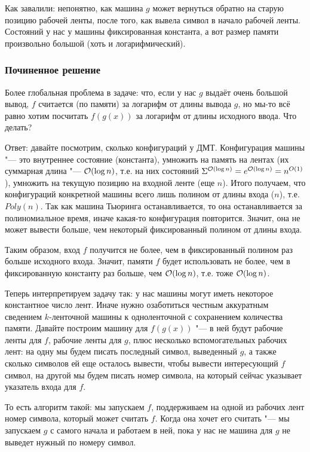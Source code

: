	Как завалили: непонятно, как машина $g$ может вернуться обратно на старую позицию рабочей ленты,
	после того, как вывела символ в начало рабочей ленты.
	Состояний у нас у машины фиксированная константа, а вот размер памяти произвольно большой (хоть и логарифмический).

	\subsubsection{Починенное решение}
	\begin{Rem}
		Более глобальная проблема в задаче: что, если у нас $g$ выдаёт очень большой вывод,
		$f$ считается (по памяти) за логарифм от длины вывода $g$, но мы-то всё равно хотим
		посчитать $f(g(x))$ за логарифм от длины исходного ввода.
		Что делать?

		Ответ: давайте посмотрим, сколько конфигураций у ДМТ.
		Конфигурация машины "--- это внутреннее состояние (константа),
		умножить на память на лентах (их суммарная длина "--- $\mathcal O(\log n)$, т.е. на них
		состояний $\Sigma^{\mathcal O(\log n)} = e^{\mathcal O(\log n)} = n^{O(1)}$),
		умножить на текущую позицию на входной ленте (еще $n$).
		Итого получаем, что конфигураций конкретной машины всего лишь полином от длины входа ($n$),
		т.е. $Poly(n)$.
		Так как машина Тьюринга останавливается, то она останавливается за полиномиальное время,
		иначе какая-то конфигурация повторится.
		Значит, она не может вывести больше, чем некоторый фиксированный полином от длины входа.

		Таким образом, вход $f$ получится не более, чем в фиксированный полином раз больше исходного входа.
		Значит, памяти $f$ будет использовать не более, чем в фиксированную константу раз больше,
		чем $\mathcal O(\log n)$, т.е. тоже $\mathcal O(\log n)$.
	\end{Rem}

	Теперь интерпретируем задачу так: у нас машины могут иметь некоторое константное число лент.
	Иначе нужно озаботиться честным аккуратным сведением $k$-ленточной машины к одноленточной с сохранением количества памяти.
	Давайте построим машину для $f(g(x))$ "--- в ней будут рабочие ленты для $f$, рабочие ленты для $g$,
	плюс несколько вспомогательных рабочих лент: на одну мы будем писать последный символ, выведенный
	$g$, а также сколько символов ей еще осталось вывести, чтобы вывести интересующий $f$ символ,
	на другой мы будем писать номер символа, на который сейчас указывает указатель входа для $f$.

	То есть алгоритм такой: мы запускаем $f$, поддерживаем на одной из рабочих лент номер символа,
	который может считать $f$.
	Когда она хочет его считать "--- мы запускаем $g$ с самого начала и работаем в ней, пока у нас не
	машина для $g$ не выведет нужный по номеру символ.

